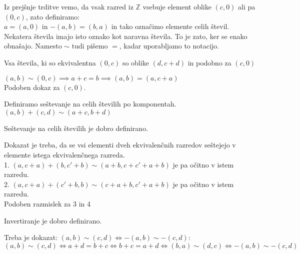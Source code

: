 \begin{definicija}
    Iz prejšnje trditve vemo, da vsak razred iz $\mathbb{Z}$ vsebuje element oblike $(c, 0)$ ali pa $(0, c)$, zato definiramo: \\
    $a = (a, 0)$ in $-(a, b) = (b, a)$ in tako označimo elemente celih števil.
    Nekatera števila imajo isto oznako kot naravna števila.
    To je zato, ker se enako obnašajo.
    Namesto $\sim$ tudi pišemo $=$, kadar uporabljamo to notacijo.
\end{definicija}

\begin{trditev}
    Vsa števila, ki so ekvivalentna $(0, c)$ so oblike $(d, c + d)$ in podobno za $(c, 0)$
\end{trditev}
\begin{dokaz}
    $(a, b) \sim (0, c) \implies a + c = b \implies (a, b) = (a, c + a)$ \\
    Podoben dokaz za $(c, 0)$.
\end{dokaz}

\begin{definicija}
    Definiramo seštevanje na celih številih po komponentah.
    $(a, b) + (c, d) \sim (a + c, b + d)$
\end{definicija}

\begin{trditev}
    Seštevanje na celih številih je dobro definirano.
\end{trditev}
\begin{dokaz}
    Dokazat je treba, da se vsi elementi dveh ekvivalenčnih razredov seštejejo v elemente istega ekvivalenčnega razreda. \\
    1. $(a, c + a) + (b, c' + b) \sim (a + b, c + c' + a + b)$ je pa očitno v istem razredu. \\
    2. $(a, c + a) + (c' + b, b) \sim (c + a + b, c' + a + b)$ je pa očitno v istem razredu. \\
    Podoben razmislek za 3 in 4
\end{dokaz}

\begin{trditev}
    Invertiranje je dobro definirano.
\end{trditev}
\begin{dokaz}
    Treba je dokazat: $(a, b) \sim (c, d) \iff -(a, b) \sim -(c, d)$: \\
    $(a, b) \sim (c, d) \iff a + d = b + c \iff b + c = a + d \iff (b, a) \sim (d, c) \iff -(a, b) \sim -(c, d)$
\end{dokaz}

